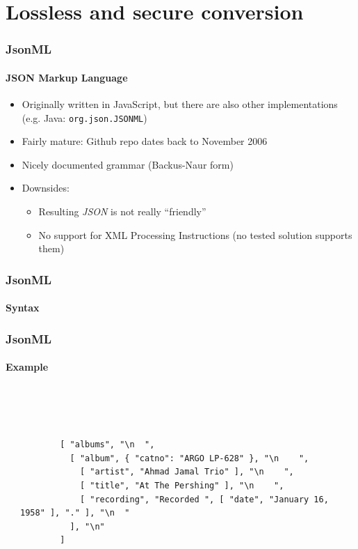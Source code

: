 \documentclass[
    alternativetitlepage=alternativ,
    cornerlogo=hgi_nds_logo2,
    sectionoverview,
]{rubpresentation}
\begin{document}
\section{Lossless and secure conversion}

\begin{frame}[fragile]
  \frametitle{JsonML}
  \framesubtitle{JSON Markup Language}
  \begin{itemize}
    \item{} Originally written in JavaScript, but there are also other implementations (e.g. Java: \texttt{org.json.JSONML})
    \item{} Fairly mature: Github repo dates back to November 2006
    \item{} Nicely documented grammar (Backus-Naur form)
    \item{} Downsides:
      \begin{itemize}
        \item{} Resulting \emph{JSON} is not really \enquote{friendly}
        \item{} No support for XML Processing Instructions (no tested solution supports them)
      \end{itemize}
  \end{itemize}
\end{frame}

\begin{frame}[fragile]
  \frametitle{JsonML}
  \framesubtitle{Syntax}
  \begin{center}
    
  \end{center}
\end{frame}

\begin{frame}[fragile]
  \frametitle{JsonML}
  \framesubtitle{Example}
  \begin{columns}[t]
    \begin{column}{0.45\textwidth}
      \inputminted[breaklines,autogobble,fontsize=\tiny]{xml}{thesis/xmltree.xml}
    \end{column}
    \begin{column}{0.55\textwidth}
      \begin{verbatim}



        [ "albums", "\n  ",
          [ "album", { "catno": "ARGO LP-628" }, "\n    ",
            [ "artist", "Ahmad Jamal Trio" ], "\n    ",
            [ "title", "At The Pershing" ], "\n    ",
            [ "recording", "Recorded ", [ "date", "January 16, 1958" ], "." ], "\n  "
          ], "\n"
        ]
      \end{verbatim}
    \end{column}
  \end{columns}
\end{frame}
\end{document}
